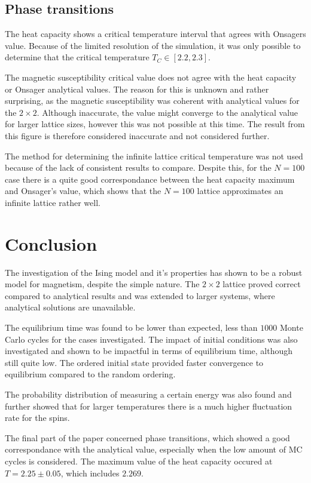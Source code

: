 \documentclass[aps,reprint]{revtex4-1}
\begin{document}
\subsection{Phase transitions}
The heat capacity shows a critical temperature interval that agrees with Onsagers
value. Because of the limited resolution of the simulation, it was only possible
to determine that the critical temperature $T_C \in [2.2, 2.3]$.

The magnetic susceptibility critical value does not agree with the heat capacity
or Onsager analytical values. The reason for this is unknown and rather surprising,
as the magnetic susceptibility was coherent with analytical values for the $2 \times 2$.
Although inaccurate, the value might converge to the analytical value for larger
lattice sizes, however this was not possible at this time. The result from this
figure is therefore considered inaccurate and not considered further.

The method for determining the infinite lattice critical temperature was not used
because of the lack of consistent results to compare. Despite this, for the
$N = 100$ case there is a quite good correspondance between the heat capacity
maximum and Onsager's value, which shows that the $N = 100$ lattice approximates
an infinite lattice rather well.

\section{Conclusion} \label{sec:conclusion}
The investigation of the Ising model and it's properties has shown to be a robust
model for magnetism, despite the simple nature. The $2 \times 2$ lattice
proved correct compared to analytical results and was extended to larger systems,
where analytical solutions are unavailable.

The equilibrium time was found to be lower than expected, less than $1000$ Monte Carlo cycles for the cases investigated.
The impact of initial conditions was also investigated and shown to be impactful
in terms of equilibrium time, although still quite low. The ordered initial state
provided faster convergence to equilibrium compared to the random ordering.

The probability distribution
of measuring a certain energy was also found and further showed that for larger
temperatures there is a much higher fluctuation rate for the spins.

The final part of the paper concerned phase transitions, which showed a good
correspondance with the analytical value, especially when the low amount of MC cycles
is considered. The maximum value of the heat capacity occured at $T = 2.25 \pm 0.05$, which
includes $2.269$.
\end{document}
